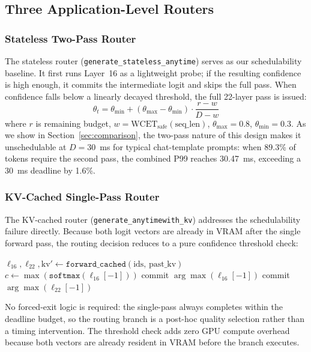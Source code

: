 \documentclass[conference]{IEEEtran}
\begin{document}
\subsection{Three Application-Level Routers}

\subsubsection{Stateless Two-Pass Router}

The stateless router (\texttt{generate\_stateless\_anytime}) serves as
our schedulability baseline.
It first runs Layer~16 as a lightweight probe; if the resulting
confidence is high enough, it commits the intermediate logit and skips
the full pass.
When confidence falls below a linearly decayed threshold, the full
22-layer pass is issued:
\begin{equation}
\theta_t = \theta_{\min} + (\theta_{\max} - \theta_{\min})
           \cdot \frac{r - w}{D - w}
\label{eq:decay}
\end{equation}
where $r$ is remaining budget, $w = \text{WCET}_{\text{safe}}(\text{seq\_len})$,
$\theta_{\max}=0.8$, $\theta_{\min}=0.3$.
As we show in Section~\ref{sec:comparison}, the two-pass nature of this
design makes it unschedulable at $D=30$~ms for typical chat-template
prompts: when 89.3\% of tokens require the second pass, the combined
P99 reaches 30.47~ms, exceeding a 30~ms deadline by 1.6\%.

\subsubsection{KV-Cached Single-Pass Router}

The KV-cached router (\texttt{generate\_anytime\discretionary{\_}{}{\_}with\_kv})
addresses the schedulability failure directly.
Because both logit vectors are already in VRAM after the single forward
pass, the routing decision reduces to a pure confidence threshold check:
\begin{algorithmic}[1]
\STATE $\ell_{16}, \ell_{22}, \text{kv}' \leftarrow
       \texttt{forward\_cached}(\text{ids},\, \text{past\_kv})$
\STATE $c \leftarrow \max(\texttt{softmax}(\ell_{16}[-1]))$
    \STATE commit $\arg\max(\ell_{16}[-1])$ 
\ELSE
    \STATE commit $\arg\max(\ell_{22}[-1])$ 
\ENDIF
\end{algorithmic}

No forced-exit logic is required: the single-pass always completes
within the deadline budget, so the routing branch is a post-hoc
quality selection rather than a timing intervention.
The threshold check adds zero GPU compute overhead because both vectors
are already resident in VRAM before the branch executes.
\end{document}
